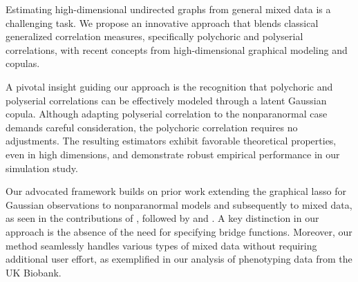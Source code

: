

Estimating high-dimensional undirected graphs from general mixed data is a challenging task. We propose an innovative approach that blends classical generalized correlation measures, specifically polychoric and polyserial correlations, with recent concepts from high-dimensional graphical modeling and copulas.

A pivotal insight guiding our approach is the recognition that polychoric and polyserial correlations can be effectively modeled through a latent Gaussian copula. Although adapting polyserial correlation to the nonparanormal case demands careful consideration, the polychoric correlation requires no adjustments. The resulting estimators exhibit favorable theoretical properties, even in high dimensions, and demonstrate robust empirical performance in our simulation study.

Our advocated framework builds on prior work extending the graphical lasso for Gaussian observations to nonparanormal models and subsequently to mixed data, as seen in the contributions of \cite{Fan17}, followed by \cite{Quan18} and \cite{Feng19}. A key distinction in our approach is the absence of the need for specifying bridge functions. Moreover, our method seamlessly handles various types of mixed data without requiring additional user effort, as exemplified in our analysis of phenotyping data from the UK Biobank.